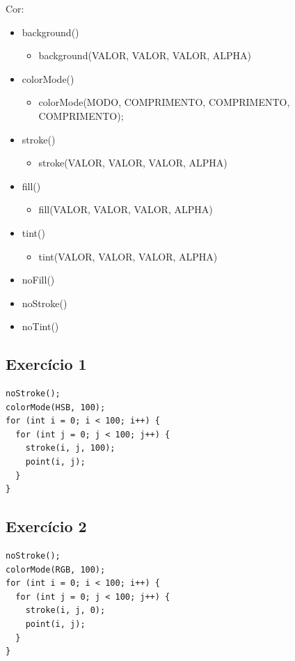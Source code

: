 \documentclass[12pt]{article}
\begin{document}
Cor:
\begin{itemize}
\item background()
\begin{itemize}
\item background(VALOR, VALOR, VALOR, ALPHA)
\end{itemize}	
\item colorMode()
\begin{itemize}
\item colorMode(MODO, COMPRIMENTO, COMPRIMENTO, COMPRIMENTO);
\end{itemize}
\item stroke()
\begin{itemize}
\item stroke(VALOR, VALOR, VALOR, ALPHA)
\end{itemize}	
\item fill()
\begin{itemize}
\item fill(VALOR, VALOR, VALOR, ALPHA)
\end{itemize}	
\item tint()
\begin{itemize}
\item tint(VALOR, VALOR, VALOR, ALPHA)
\end{itemize}
\item noFill()
\item noStroke()
\item noTint()
\end{itemize}

\subsection{Exercício 1}

\begin{verbatim}
noStroke();
colorMode(HSB, 100);
for (int i = 0; i < 100; i++) {
  for (int j = 0; j < 100; j++) {
    stroke(i, j, 100);
    point(i, j);
  }
}
\end{verbatim}

\subsection{Exercício 2}

\begin{verbatim}
noStroke();
colorMode(RGB, 100);
for (int i = 0; i < 100; i++) {
  for (int j = 0; j < 100; j++) {
    stroke(i, j, 0);
    point(i, j);
  }
}
\end{verbatim}
\end{document}
